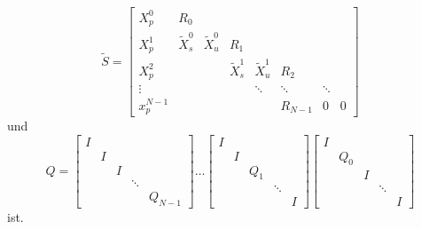$$\tilde{S}= \left[
\begin{array}{cccccccc}
X_p^0 & R_0 &  &  &  &  &  &  \\ 
X_p^1 & \tilde{X}_s^0 & \tilde{X}_u^0 & R_1 &  &  &  &  \\ 
X_p^2 &  &  & \tilde{X}_s^1 & \tilde{X}_u^1 & R_2 &  &  \\ 
\vdots &  &  &  & \ddots & \ddots & \ddots &  \\ 
x_p^{N-1} &  &  &  &  & R_{N-1} & 0 & 0
\end{array}  \right]$$
und 
$$ Q=
\left[\begin{array}{ccccc}
I & & & & \\
 &I &  &  &  \\ 
 & & I &  &  \\ 
 & &  & \ddots &  \\ 
 & &  &  & Q_{N-1}
\end{array} \right]
\hdots
\left[\begin{array}{ccccc}
I & & & & \\
 &I &  &  &  \\ 
 & & Q_1 &  &  \\ 
 & &  & \ddots &  \\ 
 & &  &  & I
\end{array}\right]
\left[\begin{array}{ccccc}
I & & & & \\
 &Q_0 &  &  &  \\ 
 & & I &  &  \\ 
 & &  & \ddots &  \\ 
 & &  &  & I
\end{array} \right]
$$ ist.